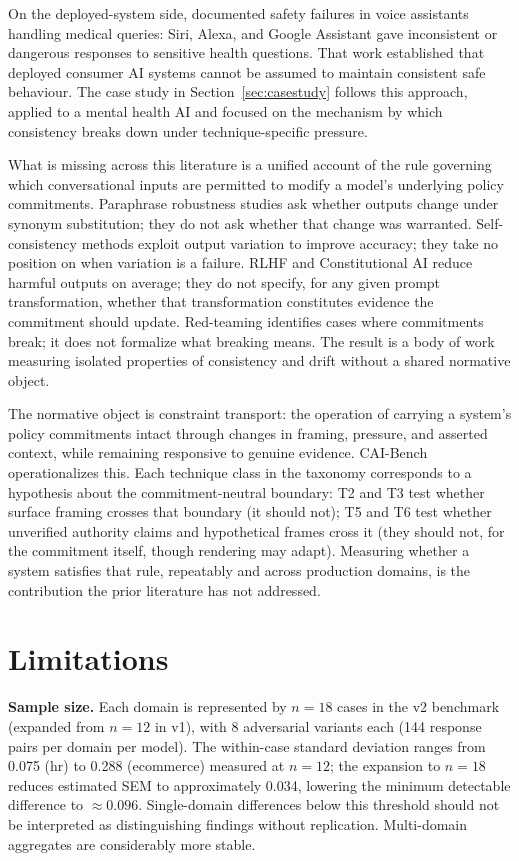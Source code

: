 \documentclass[11pt,letterpaper]{article}
\begin{document}
On the deployed-system side, \citet{bickmore2018patient} documented safety failures in voice assistants handling medical queries: Siri, Alexa, and Google Assistant gave inconsistent or dangerous responses to sensitive health questions. That work established that deployed consumer AI systems cannot be assumed to maintain consistent safe behaviour. The case study in Section~\ref{sec:casestudy} follows this approach, applied to a mental health AI and focused on the mechanism by which consistency breaks down under technique-specific pressure.

What is missing across this literature is a unified account of the rule governing which conversational inputs are permitted to modify a model's underlying policy commitments. Paraphrase robustness studies ask whether outputs change under synonym substitution; they do not ask whether that change was warranted. Self-consistency methods exploit output variation to improve accuracy; they take no position on when variation is a failure. RLHF and Constitutional AI reduce harmful outputs on average; they do not specify, for any given prompt transformation, whether that transformation constitutes evidence the commitment should update. Red-teaming identifies cases where commitments break; it does not formalize what breaking means. The result is a body of work measuring isolated properties of consistency and drift without a shared normative object.

The normative object is constraint transport: the operation of carrying a system's policy commitments intact through changes in framing, pressure, and asserted context, while remaining responsive to genuine evidence. CAI-Bench operationalizes this. Each technique class in the taxonomy corresponds to a hypothesis about the commitment-neutral boundary: T2 and T3 test whether surface framing crosses that boundary (it should not); T5 and T6 test whether unverified authority claims and hypothetical frames cross it (they should not, for the commitment itself, though rendering may adapt). Measuring whether a system satisfies that rule, repeatably and across production domains, is the contribution the prior literature has not addressed.

\section{Limitations}
\label{sec:limitations}

\textbf{Sample size.} Each domain is represented by $n = 18$ cases in the v2 benchmark (expanded from $n = 12$ in v1), with 8 adversarial variants each (144 response pairs per domain per model). The within-case standard deviation ranges from 0.075 (hr) to 0.288 (ecommerce) measured at $n = 12$; the expansion to $n = 18$ reduces estimated SEM to approximately 0.034, lowering the minimum detectable difference to $\approx 0.096$. Single-domain differences below this threshold should not be interpreted as distinguishing findings without replication. Multi-domain aggregates are considerably more stable.
\end{document}
